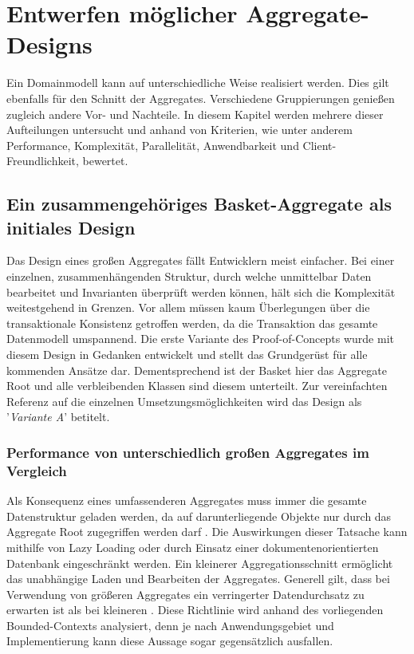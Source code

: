 \chapter{Entwerfen möglicher Aggregate-Designs}

Ein Domainmodell kann auf unterschiedliche Weise realisiert werden. Dies gilt ebenfalls für den Schnitt der Aggregates. Verschiedene Gruppierungen genießen zugleich andere Vor- und Nachteile. In diesem Kapitel werden mehrere dieser Aufteilungen untersucht und anhand von Kriterien, wie unter anderem Performance, Komplexität, Parallelität, Anwendbarkeit und Client-Freundlichkeit, bewertet.

\section{Ein zusammengehöriges Basket-Aggregate als initiales Design}

Das Design eines großen Aggregates fällt Entwicklern meist einfacher. Bei einer einzelnen, zusammenhängenden Struktur, durch welche unmittelbar Daten bearbeitet und Invarianten überprüft werden können, hält sich die Komplexität weitestgehend in Grenzen. Vor allem müssen kaum Überlegungen über die transaktionale Konsistenz getroffen werden, da die Transaktion das gesamte Datenmodell umspannend. Die erste Variante des Proof-of-Concepts wurde mit diesem Design in Gedanken entwickelt und stellt das Grundgerüst für alle kommenden Ansätze dar. Dementsprechend ist der Basket hier das Aggregate Root und alle verbleibenden Klassen sind diesem unterteilt. Zur vereinfachten Referenz auf die einzelnen Umsetzungsmöglichkeiten wird das Design als '\emph{Variante A}' betitelt.

\subsection{Performance von unterschiedlich großen Aggregates im Vergleich}

Als Konsequenz eines umfassenderen Aggregates muss immer die gesamte Datenstruktur geladen werden, da auf darunterliegende Objekte nur durch das Aggregate Root zugegriffen werden darf \cite[S. 128]{Evans.2011}. Die Auswirkungen dieser Tatsache kann mithilfe von \gls{Lazy Loading} oder durch Einsatz einer dokumentenorientierten Datenbank eingeschränkt werden. Ein kleinerer Aggregationsschnitt ermöglicht das unabhängige Laden und Bearbeiten der Aggregates. Generell gilt, dass bei Verwendung von größeren Aggregates ein verringerter Datendurchsatz zu erwarten ist als bei kleineren \cite[S. 355f.]{Vernon.2015}. Diese Richtlinie wird anhand des vorliegenden Bounded-Contexts analysiert, denn je nach Anwendungsgebiet und Implementierung kann diese Aussage sogar gegensätzlich ausfallen. 

